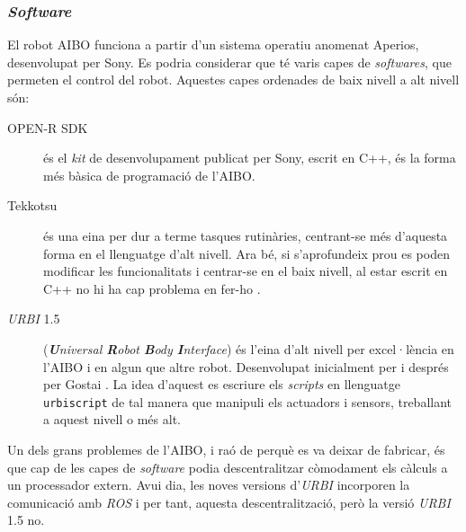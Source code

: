 \documentclass[12pt,a4paper,final,twoside]{report}
\begin{document}



\subsubsection{\textit{Software}}
\label{Software}

El robot AIBO funciona a partir d'un sistema operatiu anomenat Aperios, desenvolupat per Sony. Es podria considerar que té varis capes de \textit{softwares}, que permeten el control del robot. Aquestes capes ordenades de baix nivell a alt nivell són:

\begin{description}

\item[OPEN-R SDK] és el \textit{kit} de desenvolupament publicat per Sony, escrit en C++, és la forma més bàsica de programació de l'AIBO.

\item[Tekkotsu] és una eina per dur a terme tasques rutinàries, centrant-se més d'aquesta forma en el llenguatge d'alt nivell. Ara bé, si s'aprofundeix prou es poden modificar les funcionalitats i centrar-se en el baix nivell, al estar escrit en C++ no hi ha cap problema en fer-ho \cite{Tekkotsu}.

\item[\textit{URBI} 1.5] (\textit{\textbf{U}niversal \textbf{R}obot \textbf{B}ody \textbf{I}nterface}) és l'eina d'alt nivell per excel·lència en l'AIBO i en algun que altre robot. Desenvolupat inicialment per \cite{Baillie2005} i després per Gostai \cite{Urbi_Docs}. La idea d'aquest es escriure els \textit{scripts} en llenguatge \texttt{urbiscript} de tal manera que manipuli els actuadors i sensors, treballant a aquest nivell o més alt.

\end{description}

Un dels grans problemes de l'AIBO, i raó de perquè es va deixar de fabricar, és que cap de les capes de \textit{software} podia descentralitzar còmodament els càlculs a un processador extern. Avui dia, les noves versions d'\textit{URBI} incorporen la comunicació amb \textit{ROS} i per tant, aquesta descentralització, però la versió \textit{URBI} 1.5 no.

\end{document}
